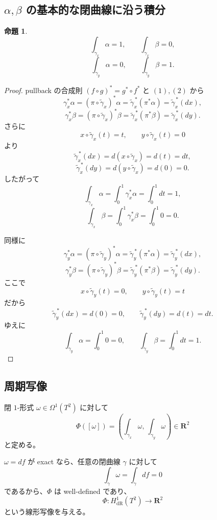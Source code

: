 \documentclass[uplatex,dvipdfmx,11pt]{jsarticle}
\newcommand{\R}{\mathbf{R}}
\theoremstyle{definition}
\newtheorem{prop}{命題}
\begin{document}
\subsection{\(\alpha,\beta\) の基本的な閉曲線に沿う積分}

\begin{prop}
\[
\int_{\gamma_x}\alpha=1,\qquad \int_{\gamma_x}\beta=0,
\]
\[
\int_{\gamma_y}\alpha=0,\qquad \int_{\gamma_y}\beta=1.
\]
\end{prop}

\begin{proof}
pullback の合成則 \((f\circ g)^*=g^*\circ f^*\) と \((1),(2)\) から
\[
\gamma_x^*\alpha=(\pi\circ \widetilde{\gamma}_x)^*\alpha
=\widetilde{\gamma}_x^{\,*}(\pi^*\alpha)
=\widetilde{\gamma}_x^{\,*}(dx),
\]
\[
\gamma_x^*\beta=(\pi\circ \widetilde{\gamma}_x)^*\beta
=\widetilde{\gamma}_x^{\,*}(\pi^*\beta)
=\widetilde{\gamma}_x^{\,*}(dy).
\]
さらに
\[
x\circ \widetilde{\gamma}_x(t)=t,\qquad y\circ \widetilde{\gamma}_x(t)=0
\]
より
\[
\widetilde{\gamma}_x^{\,*}(dx)=d(x\circ \widetilde{\gamma}_x)=d(t)=dt,
\]
\[
\widetilde{\gamma}_x^{\,*}(dy)=d(y\circ \widetilde{\gamma}_x)=d(0)=0.
\]
したがって
\[
\int_{\gamma_x}\alpha=\int_0^1 \gamma_x^*\alpha=\int_0^1 dt=1,
\]
\[
\int_{\gamma_x}\beta=\int_0^1 \gamma_x^*\beta=\int_0^1 0=0.
\]

同様に
\[
\gamma_y^*\alpha=(\pi\circ \widetilde{\gamma}_y)^*\alpha
=\widetilde{\gamma}_y^{\,*}(\pi^*\alpha)
=\widetilde{\gamma}_y^{\,*}(dx),
\]
\[
\gamma_y^*\beta=(\pi\circ \widetilde{\gamma}_y)^*\beta
=\widetilde{\gamma}_y^{\,*}(\pi^*\beta)
=\widetilde{\gamma}_y^{\,*}(dy).
\]
ここで
\[
x\circ \widetilde{\gamma}_y(t)=0,\qquad y\circ \widetilde{\gamma}_y(t)=t
\]
だから
\[
\widetilde{\gamma}_y^{\,*}(dx)=d(0)=0,\qquad
\widetilde{\gamma}_y^{\,*}(dy)=d(t)=dt.
\]
ゆえに
\[
\int_{\gamma_y}\alpha=\int_0^1 0=0,\qquad
\int_{\gamma_y}\beta=\int_0^1 dt=1.
\]
\end{proof}

\subsection{周期写像}

閉 $1$-形式 \(\omega\in\Omega^1(T^2)\) に対して
\[
\Phi([\omega])
=
\left(
\int_{\gamma_x}\omega,\,
\int_{\gamma_y}\omega
\right)\in \R^2
\]
と定める。

\(\omega=df\) が exact なら、任意の閉曲線 \(\gamma\) に対して
\[
\int_\gamma \omega=\int_\gamma df=0
\]
であるから、\(\Phi\) は well-defined であり、
\[
\Phi:H^1_{\mathrm{dR}}(T^2)\to \R^2
\]
という線形写像を与える。
\end{document}
